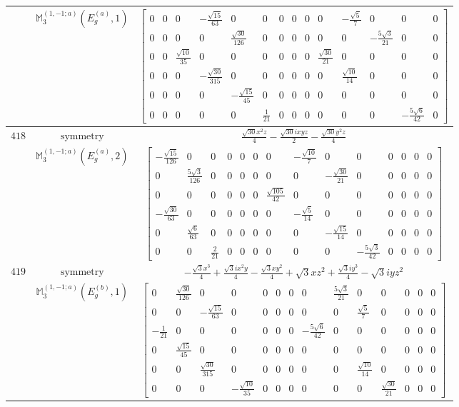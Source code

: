 \documentclass[fleqn,8pt,landscape]{jsarticle}
\begin{document}
\begin{longtable}{ccc}
$  $ & $ \mathbb{M}_{3}^{(1,-1;a)}(E_{g}^{(a)},1) $ & $ \begin{bmatrix} 0 & 0 & 0 & - \frac{\sqrt{15}}{63} & 0 & 0 & 0 & 0 & 0 & 0 & - \frac{\sqrt{5}}{7} & 0 & 0 & 0 \\ 0 & 0 & 0 & 0 & \frac{\sqrt{30}}{126} & 0 & 0 & 0 & 0 & 0 & 0 & - \frac{5 \sqrt{3}}{21} & 0 & 0 \\ 0 & 0 & \frac{\sqrt{10}}{35} & 0 & 0 & 0 & 0 & 0 & 0 & \frac{\sqrt{30}}{21} & 0 & 0 & 0 & 0 \\ 0 & 0 & 0 & - \frac{\sqrt{30}}{315} & 0 & 0 & 0 & 0 & 0 & 0 & \frac{\sqrt{10}}{14} & 0 & 0 & 0 \\ 0 & 0 & 0 & 0 & - \frac{\sqrt{15}}{45} & 0 & 0 & 0 & 0 & 0 & 0 & 0 & 0 & 0 \\ 0 & 0 & 0 & 0 & 0 & \frac{1}{21} & 0 & 0 & 0 & 0 & 0 & 0 & - \frac{5 \sqrt{6}}{42} & 0 \end{bmatrix} $ \\ \hline
$ 418 $ & $ \text{symmetry} $ & $ \frac{\sqrt{30} x^{2} z}{4} - \frac{\sqrt{30} i x y z}{2} - \frac{\sqrt{30} y^{2} z}{4} $ \\
$  $ & $ \mathbb{M}_{3}^{(1,-1;a)}(E_{g}^{(a)},2) $ & $ \begin{bmatrix} - \frac{\sqrt{15}}{126} & 0 & 0 & 0 & 0 & 0 & 0 & - \frac{\sqrt{10}}{7} & 0 & 0 & 0 & 0 & 0 & 0 \\ 0 & \frac{5 \sqrt{3}}{126} & 0 & 0 & 0 & 0 & 0 & 0 & - \frac{\sqrt{30}}{21} & 0 & 0 & 0 & 0 & 0 \\ 0 & 0 & 0 & 0 & 0 & 0 & \frac{\sqrt{105}}{42} & 0 & 0 & 0 & 0 & 0 & 0 & 0 \\ - \frac{\sqrt{30}}{63} & 0 & 0 & 0 & 0 & 0 & 0 & - \frac{\sqrt{5}}{14} & 0 & 0 & 0 & 0 & 0 & 0 \\ 0 & \frac{\sqrt{6}}{63} & 0 & 0 & 0 & 0 & 0 & 0 & - \frac{\sqrt{15}}{14} & 0 & 0 & 0 & 0 & 0 \\ 0 & 0 & \frac{2}{21} & 0 & 0 & 0 & 0 & 0 & 0 & - \frac{5 \sqrt{3}}{42} & 0 & 0 & 0 & 0 \end{bmatrix} $ \\ \hline
$ 419 $ & $ \text{symmetry} $ & $ - \frac{\sqrt{3} x^{3}}{4} + \frac{\sqrt{3} i x^{2} y}{4} - \frac{\sqrt{3} x y^{2}}{4} + \sqrt{3} x z^{2} + \frac{\sqrt{3} i y^{3}}{4} - \sqrt{3} i y z^{2} $ \\
$  $ & $ \mathbb{M}_{3}^{(1,-1;a)}(E_{g}^{(b)},1) $ & $ \begin{bmatrix} 0 & \frac{\sqrt{30}}{126} & 0 & 0 & 0 & 0 & 0 & 0 & \frac{5 \sqrt{3}}{21} & 0 & 0 & 0 & 0 & 0 \\ 0 & 0 & - \frac{\sqrt{15}}{63} & 0 & 0 & 0 & 0 & 0 & 0 & \frac{\sqrt{5}}{7} & 0 & 0 & 0 & 0 \\ - \frac{1}{21} & 0 & 0 & 0 & 0 & 0 & 0 & - \frac{5 \sqrt{6}}{42} & 0 & 0 & 0 & 0 & 0 & 0 \\ 0 & \frac{\sqrt{15}}{45} & 0 & 0 & 0 & 0 & 0 & 0 & 0 & 0 & 0 & 0 & 0 & 0 \\ 0 & 0 & \frac{\sqrt{30}}{315} & 0 & 0 & 0 & 0 & 0 & 0 & \frac{\sqrt{10}}{14} & 0 & 0 & 0 & 0 \\ 0 & 0 & 0 & - \frac{\sqrt{10}}{35} & 0 & 0 & 0 & 0 & 0 & 0 & \frac{\sqrt{30}}{21} & 0 & 0 & 0 \end{bmatrix} $ \\ \hline

\end{longtable}
\end{document}
